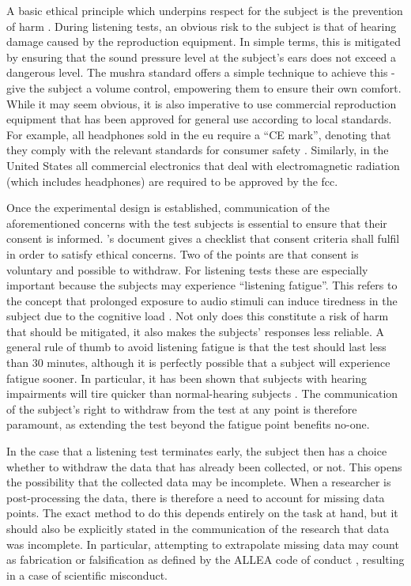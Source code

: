 \documentclass{article}
\begin{document}
A basic ethical principle which underpins respect for the subject is the prevention of harm \cite{tauginieneGeneralGuidelinesAcademic2018}. During listening tests, an obvious risk to the subject is that of hearing damage caused by the reproduction equipment. In simple terms, this is mitigated by ensuring that the sound pressure level at the subject's ears does not exceed a dangerous level. The \gls{mushra} standard \cite{itu-r-bs-1534_MUSHRA} offers a simple technique to achieve this - give the subject a volume control, empowering them to ensure their own comfort. While it may seem obvious, it is also imperative to use commercial reproduction equipment that has been approved for general use according to local standards. For example, all headphones sold in the \gls{eu} require a \enquote{CE mark}, denoting that they comply with the relevant standards for consumer safety \cite{CEMarkingObtaining,LegislationRegulationProduct}. Similarly, in the United States all commercial electronics that deal with electromagnetic radiation (which includes headphones) are required to be approved by the \gls{fcc}. 

Once the experimental design is established, communication of the aforementioned concerns with the test subjects is essential to ensure that their consent is informed. \citeauthor{akermanGoodResearchPractice}'s document  \cite{akermanGoodResearchPractice} gives a checklist that consent criteria shall fulfil in order to satisfy ethical concerns. Two of the points are that consent is voluntary and possible to withdraw. For listening tests these are especially important because the subjects may experience \enquote{listening fatigue}. This refers to the concept that prolonged exposure to audio stimuli can induce tiredness in the subject due to the cognitive load \cite{ronnbergListeningEffortFatigue2014}. Not only does this constitute a risk of harm that should be mitigated, it also makes the subjects' responses less reliable. A general rule of thumb to avoid listening fatigue is that the test should last less than 30 minutes, although it is perfectly possible that a subject will experience fatigue sooner. In particular, it has been shown that subjects with hearing impairments will tire quicker than normal-hearing subjects \cite{ListeningFatigue}. The communication of the subject's right to withdraw from the test at any point is therefore paramount, as extending the test beyond the fatigue point benefits no-one.

In the case that a listening test terminates early, the subject then has a choice whether to withdraw the data that has already been collected, or not. This opens the possibility that the collected data may be incomplete. When a researcher is post-processing the data, there is therefore a need to account for missing data points. The exact method to do this depends entirely on the task at hand, but it should also be explicitly stated in the communication of the research that data was incomplete. In particular, attempting to extrapolate missing data may count as fabrication or falsification as defined by the ALLEA code of conduct \cite{allea-alleuropeanacademiesEuropeanCodeConduct2023}, resulting in a case of scientific misconduct. 
\end{document}
